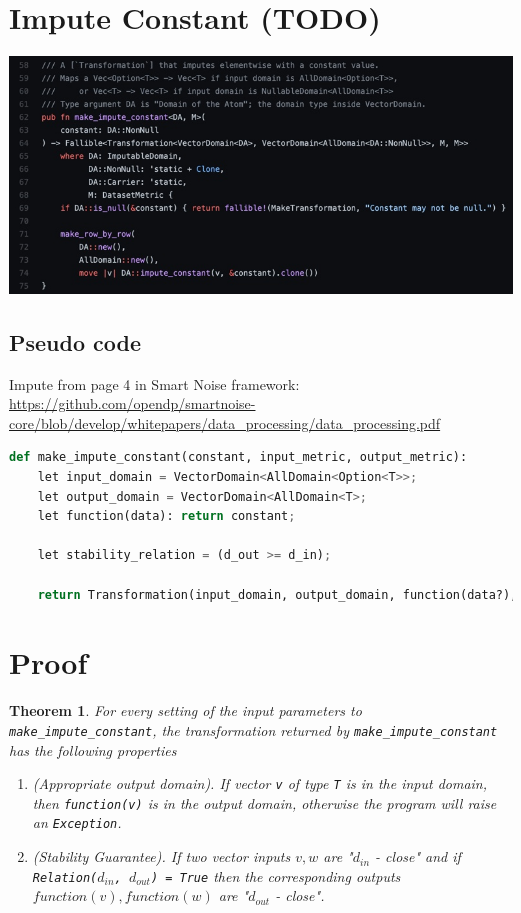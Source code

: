 \documentclass[11pt,a4paper]{article}
\newtheorem{theorem}{Theorem}[section]
\begin{document}
\section{Impute Constant (TODO)}
\includegraphics[width=\textwidth]{make_impute_constant.jpg}



\subsection{Pseudo code}



Impute from page 4 in Smart Noise framework: \url{https://github.com/opendp/smartnoise-core/blob/develop/whitepapers/data_processing/data_processing.pdf}




\begin{lstlisting}[language=Python]
def make_impute_constant(constant, input_metric, output_metric):
    let input_domain = VectorDomain<AllDomain<Option<T>>;
    let output_domain = VectorDomain<AllDomain<T>;
    let function(data): return constant;
        
    let stability_relation = (d_out >= d_in);
    
    return Transformation(input_domain, output_domain, function(data?), input_metric, output_metric, stability_relation)

\end{lstlisting}

\section{Proof}
\begin{theorem}
For every setting of the input parameters to \texttt{make\_impute\_constant}, the transformation returned by \texttt{make\_impute\_constant} has the following properties
\begin{enumerate}
    \item \textup{(Appropriate output domain).} If vector \texttt{v} of type \texttt{T} is in the input domain, then \texttt{function(v)} is in the output domain, otherwise the program will raise an \texttt{Exception}. 
    \item \textup{(Stability Guarantee).} If two vector inputs $v, w$ are "$d_{in}$ - close" and if \texttt{Relation($d_{in}$, $d_{out}$) = True} then the corresponding outputs $function(v), function(w)$ are "$d_{out}$ - close". 
\end{enumerate}
\end{theorem}
\end{document}
